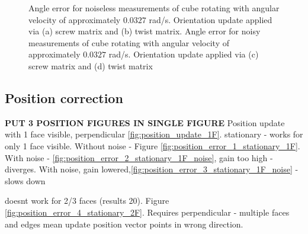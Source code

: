 \begin{figure}
{\begin{minipage}[b]{0.45\columnwidth}
 	\end{minipage}}
 	\caption{Angle error for noiseless measurements of cube rotating with angular velocity of approximately  $0.0327$ rad/s. Orientation update applied via (a) screw matrix and (b) twist matrix. Angle error for noisy measurements of cube rotating with angular velocity of approximately  $0.0327$ rad/s. Orientation update applied via (c) screw matrix and (d) twist matrix}
 	\label{fig:angle_error_rotating}
\end{figure}

\subsection{Position correction}
\textbf{PUT 3 POSITION FIGURES IN SINGLE FIGURE}
Position update with 1 face visible, perpendicular \ref{fig:position_update_1F}.
stationary - works for only 1 face visible. Without noise - Figure \ref{fig:position_error_1_stationary_1F}. With noise - \ref{fig:position_error_2_stationary_1F_noise}, gain too high - diverges. 
With noise, gain lowered,\ref{fig:position_error_3_stationary_1F_noise} - slows down

doesnt work for 2/3 faces (results 20). Figure \ref{fig:position_error_4_stationary_2F}.
Requires perpendicular - multiple faces and edges mean update position vector points in wrong direction.\\

